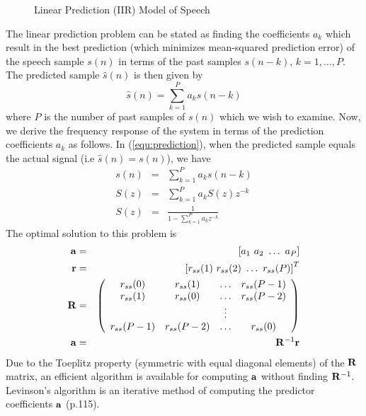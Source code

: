 \begin{figure}[htb]
  \begin{center}
      \vspace*{1.5cm}
      \caption{Linear Prediction (IIR) Model of Speech}
      \label{fig:lpc model}
  \end{center}
\end{figure}


The linear prediction problem can be stated as finding the 
coefficients $a_k$ which result in the best prediction (which minimizes 
mean-squared prediction error) of the speech sample $s(n)$ in terms of 
the past samples $s(n-k)$, $k=1,\ldots,P$.  The predicted sample 
$\hat{s}(n)$ is then given by \cite{Rabiner}
\begin{equation}
        \hat{s}(n) = \sum_{k=1}^{P} a_k s(n-k)
\label{equ:prediction}
\end{equation}
where $P$ is the number of past samples of $s(n)$ which we wish to
examine.  Now, we derive the frequency response 
of the system in terms of the prediction coefficients 
$a_{k}$ as follows.  In (\ref{equ:prediction}), when the predicted sample 
equals the actual signal (i.e $\hat{s}(n) = s(n)$), we have
\begin{eqnarray}
        s(n) & = & \sum_{k=1}^{P} a_k s(n-k)    \nonumber \\
        S(z) & = & \sum_{k=1}^{P} a_k S(z)z^{-k}    \nonumber \\
        S(z) & = & \frac{1}{1 - \sum_{k=1}^{P}a_{k}z^{-k}}
\label{equ:IIR}
\end{eqnarray}
The optimal solution to this problem is \cite{Rabiner}
\begin{eqnarray}
        {\bf a} & = & \left[a_1 \,\, a_2 \,\, 
                        \ldots \,\, a_P \right] \nonumber \\
        {\bf r} & = & \left[r_{ss}(1)\,\, r_{ss}(2) \,\, 
                        \ldots \,\, r_{ss}(P) \right]^{T} \nonumber \\
        {\bf R} & = & \left(\begin{array}{c c c c c c}
        r_{ss}(0) & r_{ss}(1) & \ldots & r_{ss}(P-1) \nonumber \\ 
        r_{ss}(1) & r_{ss}(0) & \ldots & r_{ss}(P-2)  \nonumber \\
        & & \vdots \nonumber \\
        r_{ss}(P-1) & r_{ss}(P-2) & \ldots & r_{ss}(0) \nonumber \\
        \end{array}\right) \nonumber \\
        {\bf a} & = & {\bf R}^{-1}{\bf r}
\end{eqnarray}
Due to the Toeplitz property (symmetric with 
equal diagonal elements) of the ${\bf R}$ matrix, an efficient 
algorithm is available for computing ${\bf a}$ without finding 
${\bf R}^{-1}$.  Levinson's algorithm is an iterative method of 
computing the predictor coefficients ${\bf a}$ \cite{Rabiner} (p.115).

